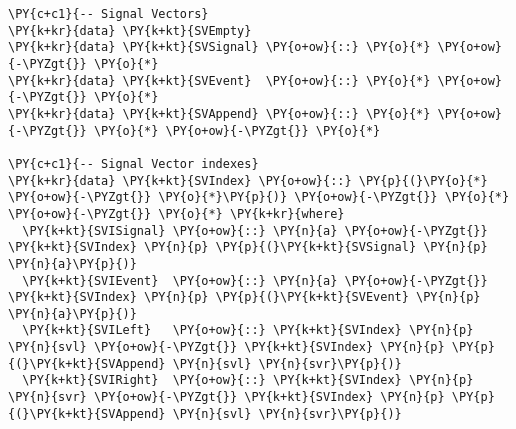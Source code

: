 \begin{Verbatim}[commandchars=\\\{\}]
\PY{c+c1}{-- Signal Vectors}
\PY{k+kr}{data} \PY{k+kt}{SVEmpty}
\PY{k+kr}{data} \PY{k+kt}{SVSignal} \PY{o+ow}{::} \PY{o}{*} \PY{o+ow}{-\PYZgt{}} \PY{o}{*}
\PY{k+kr}{data} \PY{k+kt}{SVEvent}  \PY{o+ow}{::} \PY{o}{*} \PY{o+ow}{-\PYZgt{}} \PY{o}{*}
\PY{k+kr}{data} \PY{k+kt}{SVAppend} \PY{o+ow}{::} \PY{o}{*} \PY{o+ow}{-\PYZgt{}} \PY{o}{*} \PY{o+ow}{-\PYZgt{}} \PY{o}{*}

\PY{c+c1}{-- Signal Vector indexes}
\PY{k+kr}{data} \PY{k+kt}{SVIndex} \PY{o+ow}{::} \PY{p}{(}\PY{o}{*} \PY{o+ow}{-\PYZgt{}} \PY{o}{*}\PY{p}{)} \PY{o+ow}{-\PYZgt{}} \PY{o}{*} \PY{o+ow}{-\PYZgt{}} \PY{o}{*} \PY{k+kr}{where}
  \PY{k+kt}{SVISignal} \PY{o+ow}{::} \PY{n}{a} \PY{o+ow}{-\PYZgt{}} \PY{k+kt}{SVIndex} \PY{n}{p} \PY{p}{(}\PY{k+kt}{SVSignal} \PY{n}{p} \PY{n}{a}\PY{p}{)}
  \PY{k+kt}{SVIEvent}  \PY{o+ow}{::} \PY{n}{a} \PY{o+ow}{-\PYZgt{}} \PY{k+kt}{SVIndex} \PY{n}{p} \PY{p}{(}\PY{k+kt}{SVEvent} \PY{n}{p} \PY{n}{a}\PY{p}{)}
  \PY{k+kt}{SVILeft}   \PY{o+ow}{::} \PY{k+kt}{SVIndex} \PY{n}{p} \PY{n}{svl} \PY{o+ow}{-\PYZgt{}} \PY{k+kt}{SVIndex} \PY{n}{p} \PY{p}{(}\PY{k+kt}{SVAppend} \PY{n}{svl} \PY{n}{svr}\PY{p}{)}
  \PY{k+kt}{SVIRight}  \PY{o+ow}{::} \PY{k+kt}{SVIndex} \PY{n}{p} \PY{n}{svr} \PY{o+ow}{-\PYZgt{}} \PY{k+kt}{SVIndex} \PY{n}{p} \PY{p}{(}\PY{k+kt}{SVAppend} \PY{n}{svl} \PY{n}{svr}\PY{p}{)}
\end{Verbatim}
